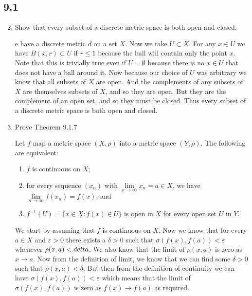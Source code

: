 \documentclass[letterpaper]{article}
\begin{document}
\renewcommand{\labelenumi}{\Alph{enumi}.}
\renewcommand{\labelenumii}{(\alph{enumii})}
\subsection*{9.1}
\begin{enumerate}
\setcounter{enumi}{1}
\item
Show that every subset of a discrete metric space is both open and closed.

e have a discrete metric $d$ on a set $X$. Now we take $U\subset X$. For any $x\in U$ we have $B(x,r)\subset U$ if $r\le 1$ because the ball will contain only the point $x$. Note that this is trivially true even if $U=\emptyset$ because there is no $x\in U$ that does not have a ball around it. Now because our choice of $U$ was arbitrary we know that all subsets of $X$ are open. And the complements of any subsets of $X$ are themselves subsets of $X$, and so they are open. But they are the complement of an open set, and so  they must be closed. Thus every subset of a discrete metric space is both open and closed.
\setcounter{enumi}{3}
\item
Prove Theorem 9.1.7

Let $f$ map a metric space $(X,\rho)$ into a metric space $(Y,\rho)$. The
following are equivalent:
\renewcommand{\labelenumii}{(\arabic{enumii})}
  \begin{enumerate}
    \item
    $f$ is continuous on $X$;

    \item
    for every sequence $(x_n)$ with $\lim\limits_{n\to\infty}x_n=a\in X$, we
    have $\lim\limits_{n\to\infty}f(x_n)=f(x)$; and
    \item
    $f^{-1}(U)=\{x\in X:f(x)\in U\}$ is open in $X$ for every open set $U$ in $Y$.
  \end{enumerate}

  We start by assuming that $f$ is continuous on $X$. Now we know that for every $a\in X$ and $\varepsilon>0$ there exists a $\delta>0$ such that $\sigma(f(x),f(a))<\varepsilon$ whenever $\rho(x,a)<\\delta$. We also know that the limit of $\rho(x,a)$ is zero as $x\to a$. Now from the definition of limit, we know that we can find some $\delta>0$ such that $\rho(x,a)<\delta$. But then from the definition of continuity we can have $\sigma(f(x),f(a))<\varepsilon$ which means that the limit of $\sigma(f(x),f(a))$ is zero as $f(x)\to f(a)$ as required.


\end{enumerate}
\end{document}
